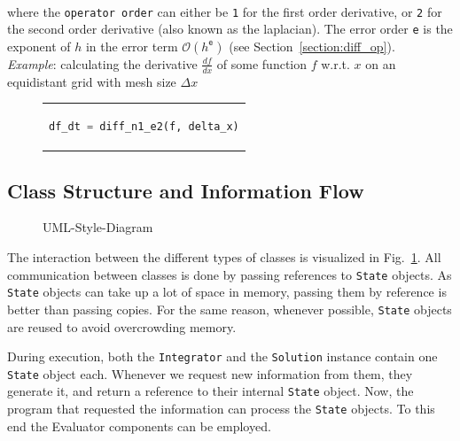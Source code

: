 \\
where the \texttt{operator order} can either be \texttt{1} for the first order derivative, or \texttt{2} for the second order derivative (also known as the laplacian).
The error order \texttt{e} is the exponent of $h$ in the error term $\mathcal{O}(h^\texttt{e})$ (see Section~\ref{section:diff_op}).
\\
\emph{Example}: calculating the derivative $\frac{df}{dx}$ of some function $f$ w.r.t. $x$ on an equidistant grid with mesh size $\Delta x$
\begin{figure}[htpb]
  \centering
  \begin{tabular}{c}
  \begin{lstlisting}[language=Python]
    df_dt = diff_n1_e2(f, delta_x)
  \end{lstlisting}
  \end{tabular}
\end{figure}

\subsection{Class Structure and Information Flow}
\begin{figure}[!h]
    \caption{UML-Style-Diagram}
    \label{UML_diagram}
\end{figure}
The interaction between the different types of classes is visualized in Fig.~\ref{UML_diagram}.
All communication between classes is done by passing references to \texttt{State} objects.
As \texttt{State} objects can take up a lot of space in memory, passing them by reference is better than passing copies.
For the same reason, whenever possible, \texttt{State} objects are reused to avoid overcrowding memory.

During execution, both the \texttt{Integrator} and the \texttt{Solution} instance contain one \texttt{State} object each.
Whenever we request new information from them, they generate it, and return a reference to their internal \texttt{State} object.
Now, the program that requested the information can process the \texttt{State} objects.
To this end the Evaluator components can be employed.

